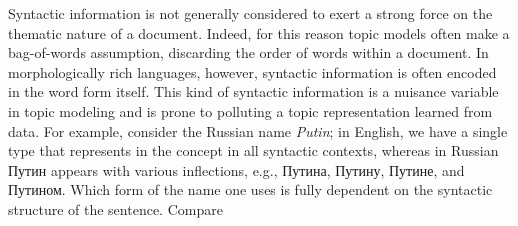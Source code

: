 \documentclass[11pt,letterpaper]{article}
\begin{document}
Syntactic information is not generally considered to exert a strong
force on the thematic nature of a document.  Indeed, for this reason
topic models often make a bag-of-words assumption, discarding the order
of words within a document.  In morphologically rich languages,
however, syntactic information is often encoded in the word form
itself.  This kind of syntactic information is a nuisance variable
in topic modeling and is prone to polluting a topic representation
learned from data.  For example, consider the Russian name
{\em Putin}; in English, we have a single type that represents in the
concept in all syntactic contexts, whereas in Russian
{ Путин} appears with various inflections,
e.g., {Путина},
{Путину}, {Путине},
and {Путином}. Which form of the name one uses
is fully dependent on the syntactic structure of the sentence. Compare
\end{document}
